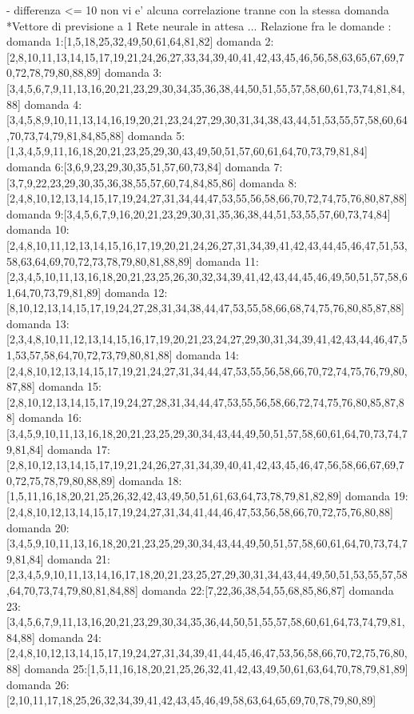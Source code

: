 - differenza <= 10  non vi e' alcuna correlazione tranne con la stessa domanda
*Vettore di previsione a 1
Rete neurale in attesa ...
Relazione fra le domande :
domanda 1:[1,5,18,25,32,49,50,61,64,81,82]
domanda 2:[2,8,10,11,13,14,15,17,19,21,24,26,27,33,34,39,40,41,42,43,45,46,56,58,63,65,67,69,70,72,78,79,80,88,89]
domanda 3:[3,4,5,6,7,9,11,13,16,20,21,23,29,30,34,35,36,38,44,50,51,55,57,58,60,61,73,74,81,84,88]
domanda 4:[3,4,5,8,9,10,11,13,14,16,19,20,21,23,24,27,29,30,31,34,38,43,44,51,53,55,57,58,60,64,70,73,74,79,81,84,85,88]
domanda 5:[1,3,4,5,9,11,16,18,20,21,23,25,29,30,43,49,50,51,57,60,61,64,70,73,79,81,84]
domanda 6:[3,6,9,23,29,30,35,51,57,60,73,84]
domanda 7:[3,7,9,22,23,29,30,35,36,38,55,57,60,74,84,85,86]
domanda 8:[2,4,8,10,12,13,14,15,17,19,24,27,31,34,44,47,53,55,56,58,66,70,72,74,75,76,80,87,88]
domanda 9:[3,4,5,6,7,9,16,20,21,23,29,30,31,35,36,38,44,51,53,55,57,60,73,74,84]
domanda 10:[2,4,8,10,11,12,13,14,15,16,17,19,20,21,24,26,27,31,34,39,41,42,43,44,45,46,47,51,53,58,63,64,69,70,72,73,78,79,80,81,88,89]
domanda 11:[2,3,4,5,10,11,13,16,18,20,21,23,25,26,30,32,34,39,41,42,43,44,45,46,49,50,51,57,58,61,64,70,73,79,81,89]
domanda 12:[8,10,12,13,14,15,17,19,24,27,28,31,34,38,44,47,53,55,58,66,68,74,75,76,80,85,87,88]
domanda 13:[2,3,4,8,10,11,12,13,14,15,16,17,19,20,21,23,24,27,29,30,31,34,39,41,42,43,44,46,47,51,53,57,58,64,70,72,73,79,80,81,88]
domanda 14:[2,4,8,10,12,13,14,15,17,19,21,24,27,31,34,44,47,53,55,56,58,66,70,72,74,75,76,79,80,87,88]
domanda 15:[2,8,10,12,13,14,15,17,19,24,27,28,31,34,44,47,53,55,56,58,66,72,74,75,76,80,85,87,88]
domanda 16:[3,4,5,9,10,11,13,16,18,20,21,23,25,29,30,34,43,44,49,50,51,57,58,60,61,64,70,73,74,79,81,84]
domanda 17:[2,8,10,12,13,14,15,17,19,21,24,26,27,31,34,39,40,41,42,43,45,46,47,56,58,66,67,69,70,72,75,78,79,80,88,89]
domanda 18:[1,5,11,16,18,20,21,25,26,32,42,43,49,50,51,61,63,64,73,78,79,81,82,89]
domanda 19:[2,4,8,10,12,13,14,15,17,19,24,27,31,34,41,44,46,47,53,56,58,66,70,72,75,76,80,88]
domanda 20:[3,4,5,9,10,11,13,16,18,20,21,23,25,29,30,34,43,44,49,50,51,57,58,60,61,64,70,73,74,79,81,84]
domanda 21:[2,3,4,5,9,10,11,13,14,16,17,18,20,21,23,25,27,29,30,31,34,43,44,49,50,51,53,55,57,58,64,70,73,74,79,80,81,84,88]
domanda 22:[7,22,36,38,54,55,68,85,86,87]
domanda 23:[3,4,5,6,7,9,11,13,16,20,21,23,29,30,34,35,36,44,50,51,55,57,58,60,61,64,73,74,79,81,84,88]
domanda 24:[2,4,8,10,12,13,14,15,17,19,24,27,31,34,39,41,44,45,46,47,53,56,58,66,70,72,75,76,80,88]
domanda 25:[1,5,11,16,18,20,21,25,26,32,41,42,43,49,50,61,63,64,70,78,79,81,89]
domanda 26:[2,10,11,17,18,25,26,32,34,39,41,42,43,45,46,49,58,63,64,65,69,70,78,79,80,89]

